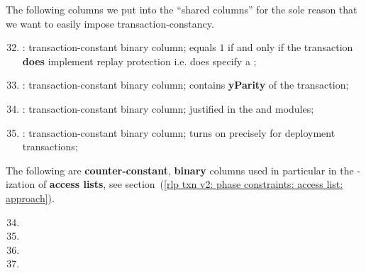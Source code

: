 The following columns we put into the ``shared columns'' for the sole reason that we want to easily impose transaction-constancy.
\begin{enumerate}
	\setcounter{enumi}{31}
    \item 
	\rlpTxnCommonColumnReplayProtection{}:
	transaction-constant binary column;
	equals $1$ if and only if the transaction \textbf{does} implement replay protection i.e.
	does specify a \chainId{};
    \item
	\rlpTxnCommonColumnYparity{}:
	transaction-constant binary column;
	contains \textbf{yParity} of the transaction;
    \item
	\rlpTxnSharedColumnRequiresEvmExecution{}:
	transaction-constant binary column;
	justified in the \userTxnDataMod{} and \hubMod{} modules;
    \item
	\markAsJustifiedHere{}
	\rlpTxnSharedColumnIsDep{}:
	transaction-constant binary column;
	turns on precisely for deployment transactions;
\end{enumerate}
The following are \textbf{counter-constant}, \textbf{binary} columns used in particular in the \rlp{}-ization of \textbf{access lists},
see section~(\ref{rlp txn v2: phase constraints: access list: approach}).
\begin{multicols}{2}
    \begin{enumerate}[resume]
	    \setcounter{enumi}{33}
	\item \rlpTxnSharedColumnIsPrefixOfAccessListItem
	\item \rlpTxnSharedColumnIsPrefixOfStorageKeyList
	\item \rlpTxnSharedColumnIsAccessListAddress
	\item \rlpTxnSharedColumnIsAccessListStorageKey
    \end{enumerate}
\end{multicols}
